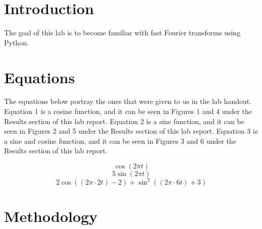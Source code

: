 \documentclass[12pt]{report}
\begin{document}
\section{Introduction}
 

The goal of this lab is to become familiar with fast Fourier transforms using Python.



   

\section{Equations}
{The equations below portray the ones that were given to us in the lab handout. Equation 1 is a cosine function, and it can be seen in Figures 1 and 4 under the Results section of this lab report. Equation 2 is a sine function, and it can be seen in Figures 2 and 5 under the Results section of this lab report. Equation 3 is a sine and cosine function, and it can be seen in Figures 3 and 6 under the Results section of this lab report. } 
 
 \begin{equation}
    \cos{(2\pi t)}
\end{equation}
\begin{equation}
    5\sin{(2\pi t)}
\end{equation}
\begin{equation}
    2\cos{((2\pi \cdot 2t)-2)}+\sin^{2}{((2\pi \cdot 6t)+3)}
\end{equation}



\section{Methodology}
\end{document}

